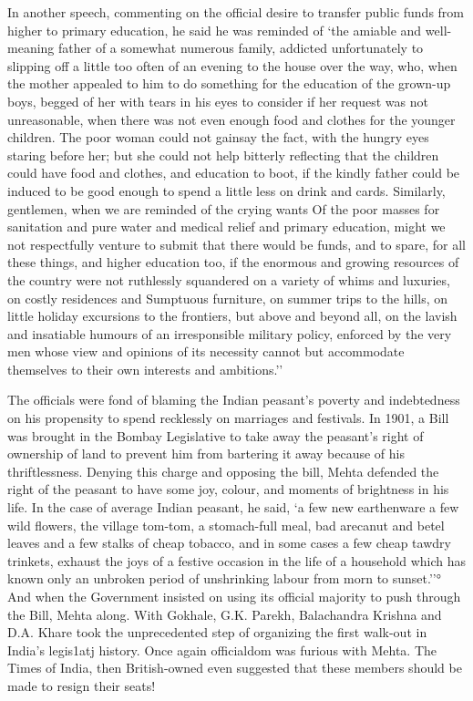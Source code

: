 In another speech, commenting on the official desire to transfer public funds from higher to primary education, he said he was reminded of `the amiable and well-meaning father of a somewhat numerous family, addicted unfortunately to slipping off a little too often of an evening to the house over the way, who, when the mother appealed to him to do something for the education of the grown-up boys, begged of her with tears in his eyes to consider if her request was not unreasonable, when there was not even enough food and clothes for the younger children. The poor woman could not gainsay the fact, with the hungry eyes staring before her; but she could not help bitterly reflecting that the children could have food and clothes, and education to boot, if the kindly father could be induced to be good enough to spend a little less on drink and cards. Similarly, gentlemen, when we are reminded of the crying wants Of the poor masses for sanitation and pure water and medical relief and primary education, might we not respectfully venture to submit that there would be funds, and to spare, for all these things, and higher education too, if the enormous and growing resources of the country were not ruthlessly squandered on a variety of whims and luxuries, on costly residences and Sumptuous furniture, on summer trips to the hills, on little holiday excursions to the frontiers, but above and beyond all, on the lavish and insatiable humours of an irresponsible military policy, enforced by the very men whose view and opinions of its necessity cannot but accommodate themselves to their own interests and ambitions.''

The officials were fond of blaming the Indian peasant's poverty and indebtedness on his propensity to spend recklessly on marriages and festivals. In 1901, a Bill was brought in the Bombay Legislative to take away the peasant's right of ownership of land to prevent him from bartering it away because of his thriftlessness. Denying this charge and opposing the bill, Mehta defended the right of the peasant to have some joy, colour, and moments of brightness in his life. In the case of average Indian peasant, he said, `a few new earthenware a few wild flowers, the village tom-tom, a stomach-full meal, bad arecanut and betel leaves and a few stalks of cheap tobacco, and in some cases a few cheap tawdry trinkets, exhaust the joys of a festive occasion in the life of a household which has known only an unbroken period of unshrinking labour from morn to sunset.''° And when the Government insisted on using its official majority to push through the Bill, Mehta along. With Gokhale, G.K. Parekh, Balachandra Krishna and D.A. Khare took the unprecedented step of organizing the first walk-out in India's legis1atj history. Once again officialdom was furious with Mehta. The Times of India, then British-owned even suggested that these members should be made to resign their seats!

